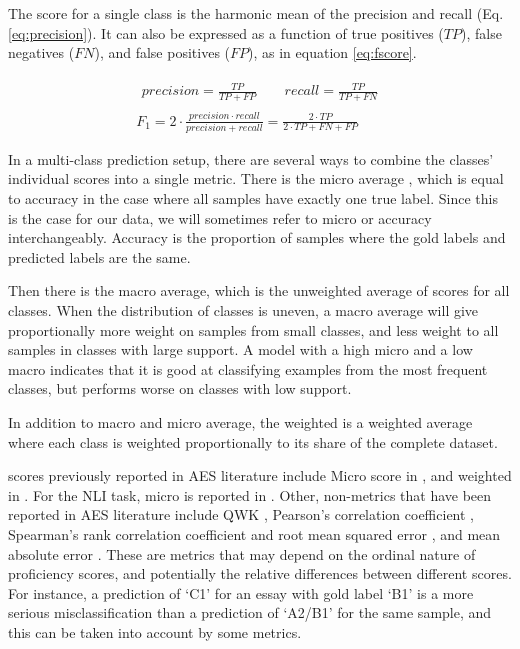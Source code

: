 The \FI score for a single class is the harmonic mean of the precision and
recall (Eq. \ref{eq:precision}). It can also be expressed as a function of
true positives ($TP$), false negatives ($FN$), and false positives ($FP$), as
in equation \ref{eq:fscore}.

\begin{gather}
  \begin{aligned}\label{eq:precision}
    precision = \frac{TP}{TP + FP} \qquad recall = \frac{TP}{TP + FN}
  \end{aligned}
  \\[2ex]
  F_1 = 2\cdot\frac{precision\cdot recall}{precision+recall}
      = {\frac{2\cdot TP}{2\cdot TP + FN + FP}}\label{eq:fscore}
\end{gather}

In a multi-class prediction setup, there are several ways to combine the
classes' individual \FI scores into a single metric. There is the micro
average \FI, which is equal to accuracy in the case where all samples have
exactly one true label. Since this is the case for our data, we will
sometimes refer to micro \FI or accuracy interchangeably. Accuracy is the
proportion of samples where the gold labels and predicted labels are the
same.

Then there is the macro average, which is the unweighted average of \FI
scores for all classes. When the distribution of classes is uneven, a macro
average will give proportionally more weight on samples from small classes,
and less weight to all samples in classes with large support. A model with a
high micro \FI and a low macro \FI indicates that it is good at classifying
examples from the most frequent classes, but performs worse on classes with
low support.

In addition to macro and micro average, the weighted \FI is a weighted
average where each class is weighted proportionally to its share of the
complete dataset.

\FI scores previously reported in \ac{AES} literature include Micro \FI score
in \textcite{vajjala17}, and weighted \FI in
\textcite{vajjala18universalCEFR}. For the \ac{NLI} task, micro \FI is
reported in \textcite{malmasi15,malmasi17}. Other, non-\FI metrics that have
been reported in \ac{AES} literature include \ac{QWK} \autocite{taghipour16,
alikaniotis2016automatic}, Pearson's correlation coefficient
\autocite{vajjala17, alikaniotis2016automatic}, Spearman's rank correlation
coefficient and root mean squared error \autocite{alikaniotis2016automatic},
and mean absolute error \autocite{vajjala17}. These are metrics that may
depend on the ordinal nature of proficiency scores, and potentially the
relative differences between different scores. For instance, a prediction of
`C1' for an essay with gold label `B1' is a more serious misclassification
than a prediction of `A2/B1' for the same sample, and this can be taken into
account by some metrics.

